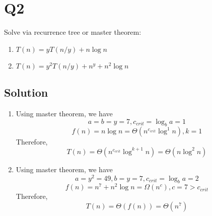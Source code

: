 
\section*{Q2}

Solve via recurrence tree or master theorem:

\begin{enumerate}
    \item $T(n) = yT(n/y) + n \log n$
    \item $T(n) = y^2T(n/y) + n^y + n^2\log n$
\end{enumerate}

\subsection*{Solution}

\begin{enumerate}
    \item Using master theorem, we have
          $$a = b = y = 7, c_{crit} = \log_b a = 1$$
          $$f(n) = n \log n = \Theta(n^{c_{crit}}\log^1n), k=1$$
          Therefore, $$T(n) = \Theta(n^{c_{crit}}\log^{k+1}n) = \Theta(n \log^2 n)$$
    \item Using master theorem, we have
          $$a = y^2 = 49, b = y = 7, c_{crit} = \log_b a = 2$$
          $$f(n) = n^7 + n^2\log n = \Omega(n^c), c = 7 > c_{crit}$$
          Therefore, $$T(n) = \Theta(f(n)) = \Theta(n^7)$$

\end{enumerate}